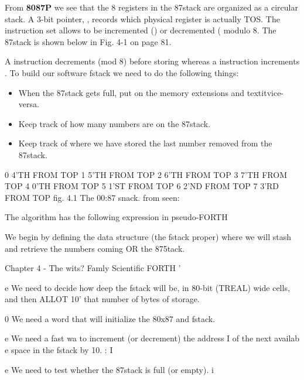 {{{{{From \textbf{8087P} we see that the 8 registers in the 87stack are organized as a circular stack. A 3-bit pointer, , records which physical register is actually TOS. The instruction set allows  to be incremented () or decremented ( modulo 8. The 87stack is shown below in Fig. 4-1 on page 81.

A  instruction decrements  (mod 8) before storing whereas a  instruction increments . To build our software fstack we need to do the following things:
\begin{itemize}
    \item When the 87stack gets full, put  on the memory extensions and textit{vice-versa}.
    \item Keep track of how many numbers are on the 87stack.
    \item Keep track of where we have stored the last number removed from the 87stack.
\end{itemize}

0 4'TH FROM TOP
1 5'TH FROM TOP
2 6'TH FROM TOP
3 7'TH FROM TOP
4 0'TH FROM TOP
5 1'ST FROM TOP
6 2’ND FROM TOP
7 3'RD FROM TOP
fig. 4.1 The 00:87 snack. from seen:

The algorithm has the following expression in pseudo-FORTH


We begin by defining the data structure (the fstack proper) where
we will stash and retrieve the numbers coming OR the 875tack.

Chapter 4 - The wits? Famly Scientific FORTH '

e We need to decide how deep the fstack will be, in 80-bit
(TREAL) wide cells, and then ALLOT 10' that number of
bytes of storage.

0 We need a word that will initialize the 80x87 and fstack.

e We need a fast wa to increment (or decrement) the address I
of the next availab e space in the fstack by 10. :
I

e We need to test whether the 87stack is full (or empty). i

}}}}}
